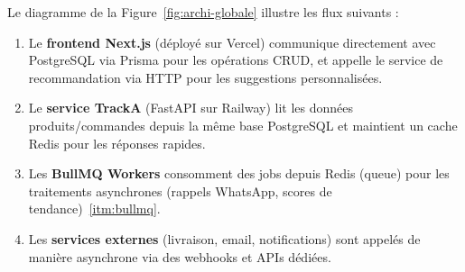 \documentclass[12pt,a4paper,openany]{report}
\begin{document}
Le diagramme de la Figure~\ref{fig:archi-globale} illustre les flux suivants :
\begin{enumerate}
  \item Le \textbf{frontend Next.js} (déployé sur Vercel) communique directement avec PostgreSQL via Prisma pour les opérations CRUD, et appelle le service de recommandation via HTTP pour les suggestions personnalisées.
  \item Le \textbf{service TrackA} (FastAPI sur Railway) lit les données produits/commandes depuis la même base PostgreSQL et maintient un cache Redis pour les réponses rapides.
  \item Les \textbf{BullMQ Workers} consomment des jobs depuis Redis (queue) pour les traitements asynchrones (rappels WhatsApp, scores de tendance)~\ref{itm:bullmq}.
  \item Les \textbf{services externes} (livraison, email, notifications) sont appelés de manière asynchrone via des webhooks et APIs dédiées.
\end{enumerate}
\end{document}
